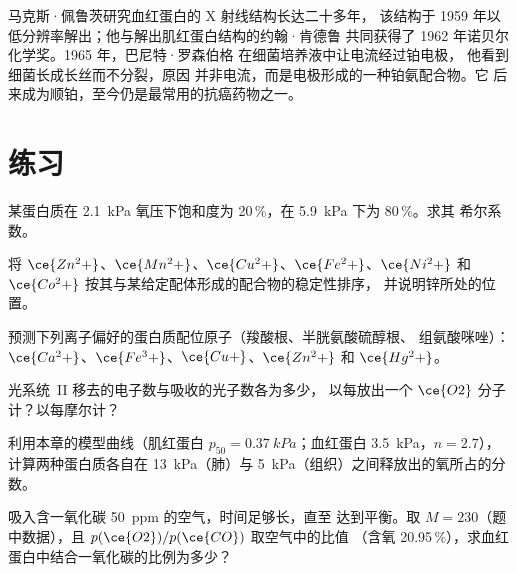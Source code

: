 \begin{history}[一种蛋白质结构与一种偶然发现的药物]
马克斯·佩鲁茨研究血红蛋白的 X 射线结构长达二十多年，
该结构于 1959 年以低分辨率解出；他与解出肌红蛋白结构的约翰·肯德鲁
共同获得了 1962 年诺贝尔化学奖。1965 年，巴尼特·罗森伯格
在细菌培养液中让电流经过铂电极，
他看到细菌长成长丝而不分裂，原因
并非电流，而是电极形成的一种铂氨配合物。它
后来成为顺铂，至今仍是最常用的抗癌药物之一。
\end{history}

\section{练习}

\begin{exercise}[$\star$]\label{exo:b3:bioinorganic:1}
某蛋白质在 \qty{2.1}{kPa} 氧压下饱和度为 20\,\%，在 \qty{5.9}{kPa} 下为 80\,\%。求其
希尔系数。
\end{exercise}

\begin{exercise}[$\star$]\label{exo:b3:bioinorganic:2}
将 $\ce{Zn^2+}$、$\ce{Mn^2+}$、$\ce{Cu^2+}$、$\ce{Fe^2+}$、$\ce{Ni^2+}$ 和 $\ce{Co^2+}$ 按其与某给定配体形成的配合物的稳定性排序，
并说明锌所处的位置。
\end{exercise}

\begin{exercise}[$\star$]\label{exo:b3:bioinorganic:3}
预测下列离子偏好的蛋白质配位原子（羧酸根、半胱氨酸硫醇根、
组氨酸咪唑）：$\ce{Ca^2+}$、$\ce{Fe^3+}$、$\ce{Cu+}$、$\ce{Zn^2+}$ 和 $\ce{Hg^2+}$。
\end{exercise}

\begin{exercise}[$\star$]\label{exo:b3:bioinorganic:4}
光系统~II 移去的电子数与吸收的光子数各为多少，
以每放出一个 $\ce{O2}$ 分子计？以每摩尔计？
\end{exercise}

\begin{exercise}[$\star\star$]\label{exo:b3:bioinorganic:5}
利用本章的模型曲线（肌红蛋白 $p_{50} = \qty{0.37}{kPa}$；血红蛋白 \qty{3.5}{kPa}，$n = 2.7$），
计算两种蛋白质各自在
\qty{13}{kPa}（肺）与 \qty{5}{kPa}（组织）之间释放出的氧所占的分数。
\end{exercise}

\begin{exercise}[$\star\star$]\label{exo:b3:bioinorganic:6}
吸入含一氧化碳 \qty{50}{ppm} 的空气，时间足够长，直至
达到平衡。取 $M = 230$（题中数据），且 $p(\ce{O2})/p(\ce{CO})$ 取空气中的比值
（含氧 20.95\,\%），求血红蛋白中结合一氧化碳的比例为多少？
\end{exercise}

